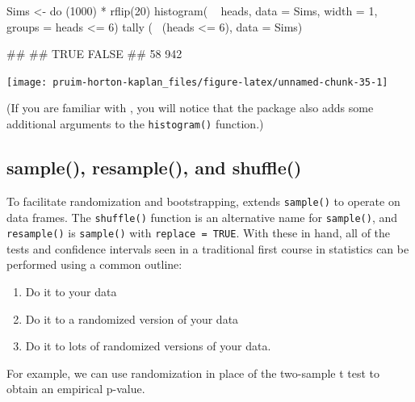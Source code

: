 \begin{Schunk}
\begin{Sinput}
Sims <- do (1000) * rflip(20)
histogram( ~ heads, data = Sims, width = 1, groups = heads <= 6)
tally ( ~(heads <= 6), data = Sims)
\end{Sinput}
\begin{Soutput}
## 
##  TRUE FALSE 
##    58   942
\end{Soutput}


\begin{center}\texttt{[image: pruim-horton-kaplan\_files/figure-latex/unnamed-chunk-35-1]} \end{center}

\end{Schunk}

\noindent
(If you are familiar with , you will notice that the
 package also adds some additional arguments to the
\texttt{histogram()} function.)

\subsection{sample(), resample(), and
shuffle()}\label{sample-resample-and-shuffle}

To facilitate randomization and bootstrapping,  extends
\texttt{sample()} to operate on data frames. The \texttt{shuffle()}
function is an alternative name for \texttt{sample()}, and
\texttt{resample()} is \texttt{sample()} with \texttt{replace\ =\ TRUE}.
With these in hand, all of the tests and confidence intervals seen in a
traditional first course in statistics can be performed using a common
outline:

\begin{enumerate}
\def\labelenumi{\arabic{enumi}.}
\tightlist
\item
  Do it to your data
\item
  Do it to a randomized version of your data
\item
  Do it to lots of randomized versions of your data.
\end{enumerate}

For example, we can use randomization in place of the two-sample t test
to obtain an empirical p-value.

